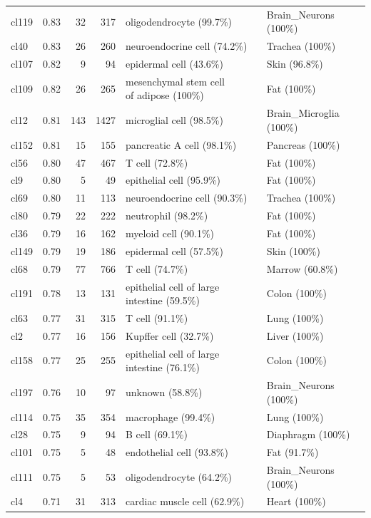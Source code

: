 \begin{table}[ht!]
\begin{tabular}{lrrrll}
  cl119 & 0.83 &  32 & 317 & oligodendrocyte (99.7\%) & Brain\_Neurons (100\%) \\ 
  cl40 & 0.83 &  26 & 260 & neuroendocrine cell (74.2\%) & Trachea (100\%) \\ 
  cl107 & 0.82 &   9 &  94 & epidermal cell (43.6\%) & Skin (96.8\%) \\ 
  cl109 & 0.82 &  26 & 265 & \specialcell[t]{mesenchymal stem cell\\of adipose (100\%)} & Fat (100\%) \\ 
  cl12 & 0.81 & 143 & 1427 & microglial cell (98.5\%) & Brain\_Microglia (100\%) \\ 
  cl152 & 0.81 &  15 & 155 & pancreatic A cell (98.1\%) & Pancreas (100\%) \\ 
  cl56 & 0.80 &  47 & 467 & T cell (72.8\%) & Fat (100\%) \\ 
  cl9 & 0.80 &   5 &  49 & epithelial cell (95.9\%) & Fat (100\%) \\ 
  cl69 & 0.80 &  11 & 113 & neuroendocrine cell (90.3\%) & Trachea (100\%) \\ 
  cl80 & 0.79 &  22 & 222 & neutrophil (98.2\%) & Fat (100\%) \\ 
  cl36 & 0.79 &  16 & 162 & myeloid cell (90.1\%) & Fat (100\%) \\ 
  cl149 & 0.79 &  19 & 186 & epidermal cell (57.5\%) & Skin (100\%) \\ 
  cl68 & 0.79 &  77 & 766 & T cell (74.7\%) & Marrow (60.8\%) \\ 
  cl191 & 0.78 &  13 & 131 & epithelial cell of large intestine (59.5\%) & Colon (100\%) \\ 
  cl63 & 0.77 &  31 & 315 & T cell (91.1\%) & Lung (100\%) \\ 
  cl2 & 0.77 &  16 & 156 & Kupffer cell (32.7\%) & Liver (100\%) \\
  cl158 & 0.77 &  25 & 255 & epithelial cell of large intestine (76.1\%) & Colon (100\%) \\ 
  cl197 & 0.76 &  10 &  97 & unknown (58.8\%) & Brain\_Neurons (100\%) \\ 
  cl114 & 0.75 &  35 & 354 & macrophage (99.4\%) & Lung (100\%) \\ 
  cl28 & 0.75 &   9 &  94 & B cell (69.1\%) & Diaphragm (100\%) \\ 
  cl101 & 0.75 &   5 &  48 & endothelial cell (93.8\%) & Fat (91.7\%) \\ 
  cl111 & 0.75 &   5 &  53 & oligodendrocyte (64.2\%) & Brain\_Neurons (100\%) \\ 
  cl4 & 0.71 &  31 & 313 & cardiac muscle cell (62.9\%) & Heart (100\%) \\ 

\end{tabular}
\end{table}
